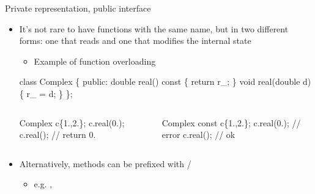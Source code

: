 \begin{frame}[fragile]{Private representation, public interface
    \insertcontinuationtext}

  \begin{itemize}

  \item It's not rare to have functions with the same name, but in two different
    forms: one that reads and one that modifies the internal state
    \begin{itemize}
    \item Example of function overloading
    \end{itemize}

    \begin{codeblock}
class Complex \{
 public:
  double real()         const \{ return r_; \}
  void   real(double d)       \{ r_ = d; \}
  \ddd
\};\end{codeblock}

    \begin{columns}
      \begin{column}{.5\textwidth}
        \begin{codeblock}
Complex c\{1.,2.\};
c.real(0.);
c.real();           // return 0.\end{codeblock}
      \end{column}
      \begin{column}{.5\textwidth}
        \begin{codeblock}
Complex const c\{1.,2.\};
c.real(0.);         // error
c.real();           // ok\end{codeblock}
      \end{column}
    \end{columns}
    
  \item Alternatively, methods can be prefixed with /
    \begin{itemize}
    \item e.g. , 
    \end{itemize}
  \end{itemize}

\end{frame}

